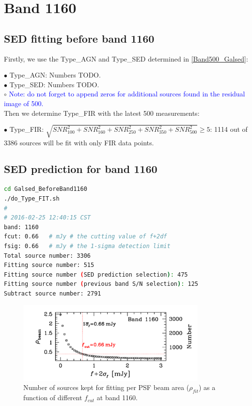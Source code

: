 \documentclass[11pt,a4paper]{article}
\begin{document}
\section{Band 1160}

\subsection{SED fitting before band 1160}
\label{Band1160_Galsed}

Firstly, we use the Type\_AGN and Type\_SED determined in \ref{Band500_Galsed}:

\indent\hspace{15pt}$\bullet$ 
Type\_AGN: Numbers TODO. 
\\
\indent\hspace{15pt}$\bullet$ 
Type\_SED: Numbers TODO. 
\\
\indent\hspace{15pt}$\circ$ 
\textcolor{blue}{Note: \textcolor{blue}{do not forget} to append zeros for additional sources found in the residual image of 500.}
\\

Then we determine Type\_FIR with the latest 500 measurements:

\indent\hspace{15pt}$\bullet$ 
Type\_FIR: $\sqrt{SNR_{100}^2+SNR_{160}^2+SNR_{250}^2+SNR_{350}^2+SNR_{500}^2} \ge 5$: 1114 out of 3386 sources will be fit with only FIR data points. 
\\

\subsection{SED prediction for band 1160}
\label{Band1160_Galpre}

\begin{lstlisting}[language=bash]
cd Galsed_BeforeBand1160
./do_Type_FIT.sh
# 
# 2016-02-25 12:40:15 CST
band: 1160
fcut: 0.66   # mJy # the cutting value of f+2df
fsig: 0.66   # mJy # the 1-sigma detection limit
Total source number: 3306
Fitting source number: 515
Fitting source number (SED prediction selection): 475
Fitting source number (previous band S/N selection): 125
Subtract source number: 2791

\end{lstlisting}

\begin{figure}[H]
	\caption{Number of sources kept for fitting per PSF beam area ($\rho_{fit}$) as a function of different $f_{cut}$ at band 1160.}
	\includegraphics[width=0.85\textwidth]{plot_cutting_flux_1160}
\end{figure}
\end{document}
